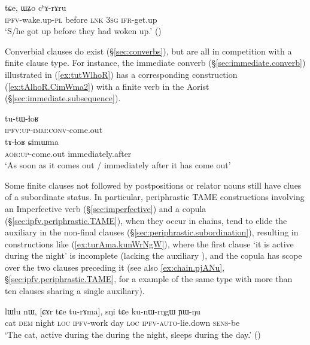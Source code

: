 \begin{exe} 
\ex \label{ex:chWstanW.CWNgW}
 tɕe, ɯʑo cʰɤ-rɤru  \\
\textsc{ipfv}-wake.up-\textsc{pl} before \textsc{lnk} \textsc{3sg} \textsc{ifr}-get.up \\
\glt `S/he got up before they had woken up.' 
()
\end{exe} 

Converbial clauses do exist (§\ref{sec:converbs}), but are all in competition with a finite clause type. For instance, the immediate converb (§\ref{sec:immediate.converb}) illustrated in (\ref{ex:tutWlhoR}) has a corresponding construction (\ref{ex:tAlhoR.CimWma2}) with a finite verb in the Aorist (§\ref{sec:immediate.subsequence}).

\begin{exe} 
\ex 
\begin{xlist}
\ex \label{ex:tutWlhoR}
\gll tu-tɯ-ɬoʁ \\
\textsc{ipfv}:\textsc{up}-\textsc{imm}:\textsc{conv}-come.out \\
\ex \label{ex:tAlhoR.CimWma2}
\gll tɤ-ɬoʁ ɕimɯma \\
\textsc{aor}:\textsc{up}-come.out immediately.after  \\
\glt `As soon as it comes out / immediately after it has come out'
\end{xlist}
\end{exe} 

Some finite clauses not followed by postpositions or relator nouns still have clues of a subordinate status. In particular, periphrastic TAME constructions involving an Imperfective verb (§\ref{sec:imperfective}) and a copula (§\ref{sec:ipfv.periphrastic.TAME}), when they occur in chains, tend to elide the auxiliary in the non-final clauses (§\ref{sec:periphrastic.subordination}), resulting in constructions like  (\ref{ex:turAma.kunWrNgW}), where the first clause  `it is active during the night' is incomplete (lacking the auxiliary ), and the copula  has scope over the two clauses preceding it (see also \ref{ex:chain.pjANu}, §\ref{sec:ipfv.periphrastic.TAME}, for a example of the same type with more than ten clauses sharing a single auxiliary).

\begin{exe} 
\ex \label{ex:turAma.kunWrNgW}
\gll lɯlu nɯ, [ɕɤr tɕe tu-rɤma], sŋi tɕe ku-nɯ-rŋgɯ ɲɯ-ŋu \\
cat \textsc{dem} night \textsc{loc} \textsc{ipfv}-work day \textsc{loc} \textsc{ipfv}-\textsc{auto}-lie.down \textsc{sens}-be \\
\glt `The cat, active during the during the night, sleeps during the day.' 
()
\end{exe} 

